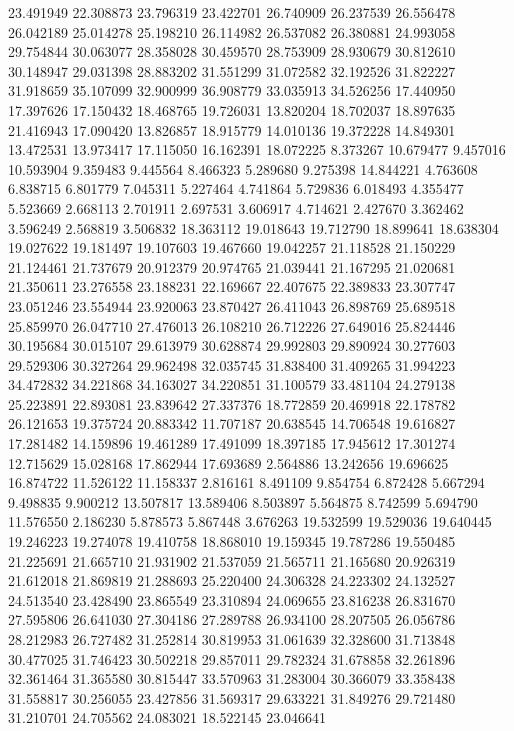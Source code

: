 23.491949
22.308873
23.796319
23.422701
26.740909
26.237539
26.556478
26.042189
25.014278
25.198210
26.114982
26.537082
26.380881
24.993058
29.754844
30.063077
28.358028
30.459570
28.753909
28.930679
30.812610
30.148947
29.031398
28.883202
31.551299
31.072582
32.192526
31.822227
31.918659
35.107099
32.900999
36.908779
33.035913
34.526256
17.440950
17.397626
17.150432
18.468765
19.726031
13.820204
18.702037
18.897635
21.416943
17.090420
13.826857
18.915779
14.010136
19.372228
14.849301
13.472531
13.973417
17.115050
16.162391
18.072225
8.373267
10.679477
9.457016
10.593904
9.359483
9.445564
8.466323
5.289680
9.275398
14.844221
4.763608
6.838715
6.801779
7.045311
5.227464
4.741864
5.729836
6.018493
4.355477
5.523669
2.668113
2.701911
2.697531
3.606917
4.714621
2.427670
3.362462
3.596249
2.568819
3.506832
18.363112
19.018643
19.712790
18.899641
18.638304
19.027622
19.181497
19.107603
19.467660
19.042257
21.118528
21.150229
21.124461
21.737679
20.912379
20.974765
21.039441
21.167295
21.020681
21.350611
23.276558
23.188231
22.169667
22.407675
22.389833
23.307747
23.051246
23.554944
23.920063
23.870427
26.411043
26.898769
25.689518
25.859970
26.047710
27.476013
26.108210
26.712226
27.649016
25.824446
30.195684
30.015107
29.613979
30.628874
29.992803
29.890924
30.277603
29.529306
30.327264
29.962498
32.035745
31.838400
31.409265
31.994223
34.472832
34.221868
34.163027
34.220851
31.100579
33.481104
24.279138
25.223891
22.893081
23.839642
27.337376
18.772859
20.469918
22.178782
26.121653
19.375724
20.883342
11.707187
20.638545
14.706548
19.616827
17.281482
14.159896
19.461289
17.491099
18.397185
17.945612
17.301274
12.715629
15.028168
17.862944
17.693689
2.564886
13.242656
19.696625
16.874722
11.526122
11.158337
2.816161
8.491109
9.854754
6.872428
5.667294
9.498835
9.900212
13.507817
13.589406
8.503897
5.564875
8.742599
5.694790
11.576550
2.186230
5.878573
5.867448
3.676263
19.532599
19.529036
19.640445
19.246223
19.274078
19.410758
18.868010
19.159345
19.787286
19.550485
21.225691
21.665710
21.931902
21.537059
21.565711
21.165680
20.926319
21.612018
21.869819
21.288693
25.220400
24.306328
24.223302
24.132527
24.513540
23.428490
23.865549
23.310894
24.069655
23.816238
26.831670
27.595806
26.641030
27.304186
27.289788
26.934100
28.207505
26.056786
28.212983
26.727482
31.252814
30.819953
31.061639
32.328600
31.713848
30.477025
31.746423
30.502218
29.857011
29.782324
31.678858
32.261896
32.361464
31.365580
30.815447
33.570963
31.283004
30.366079
33.358438
31.558817
30.256055
23.427856
31.569317
29.633221
31.849276
29.721480
31.210701
24.705562
24.083021
18.522145
23.046641

